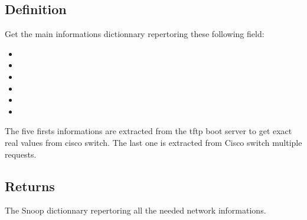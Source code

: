 \documentclass[letterpaper,10pt,english]{sphinxmanual}
\begin{document}
\subsection{Definition}
\label{\detokenize{OA/get_Dict:definition}}
\sphinxAtStartPar
Get the main informations dictionnary repertoring these following field:
\begin{itemize}
\item {} 
\sphinxAtStartPar
{}

\item {} 
\sphinxAtStartPar
{}

\item {} 
\sphinxAtStartPar
{}

\item {} 
\sphinxAtStartPar
{}

\item {} 
\sphinxAtStartPar
{}

\item {} 
\sphinxAtStartPar
{}

\end{itemize}

\sphinxAtStartPar
The five firsts informations are extracted from the tftp boot server to get exact real values from cisco switch.
The last one is extracted from Cisco switch multiple requests.


\subsection{Returns}
\label{\detokenize{OA/get_Dict:returns}}
\sphinxAtStartPar
{}

\sphinxAtStartPar
The Snoop dictionnary repertoring all the needed network informations.
\end{document}
